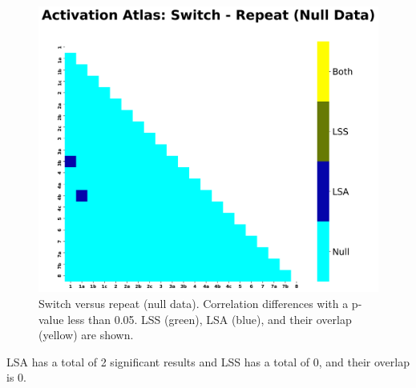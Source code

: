 \documentclass[10pt,letterpaper]{article}
\begin{document}
\begin{figure}[H]
  \centering
  \includegraphics[width=\textwidth]{data-null_atlas-activation_contrast-switchXrepeat}
  \caption{
    Switch versus repeat (null data). Correlation differences with a p-value less than 0.05.
    LSS (green), LSA (blue), and their overlap (yellow) are shown.
  }
  \label{fig:restswitchvrepeat}
\end{figure}

LSA has a total of 2 significant results and LSS has a total of 0,
and their overlap is 0.
\end{document}

